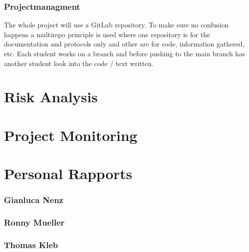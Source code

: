 \subsubsection*{Projectmanagment}
The whole project will use a GitLab repository. To make sure no confusion happens a multirepo principle is used where one repository is for the documentation and protocols only and other are for code, information gathered, etc. Each student works on a branch and before pushing to the main branch has another student look into the code / text written. 



\section{Risk Analysis}


\section{Project Monitoring}


\section{Personal Rapports}

\subsubsection*{Gianluca Nenz}


\subsubsection*{Ronny Mueller}


\subsubsection*{Thomas Kleb}

